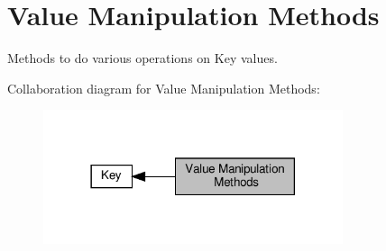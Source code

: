 \hypertarget{group__keyvalue}{}\section{Value Manipulation Methods}
\label{group__keyvalue}


Methods to do various operations on Key values.  


Collaboration diagram for Value Manipulation Methods\+:
\nopagebreak
\begin{figure}[H]
\begin{center}
\leavevmode
\includegraphics[width=249pt]{group__keyvalue}
\end{center}
\end{figure}
